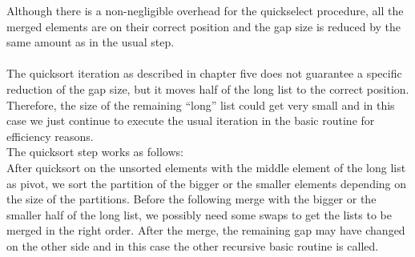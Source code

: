 \documentclass[11pt,pdftex,a4paper, twocolumn]{article}
\begin{document}
Although there is a non-negligible overhead for the quickselect procedure, all the merged elements are on their correct position and the gap size is reduced by the same amount as in the usual step. \\
$ $ \\
The quicksort iteration as described in chapter five does not guarantee a specific reduction of the gap size, but it moves half of the long list to the correct position. Therefore, the size of the remaining “long” list could get very small and in this case we just continue to execute the usual iteration in the basic routine for efficiency reasons. \\
The quicksort step works as follows: \\
After quicksort on the unsorted elements with the middle element of the long list as pivot, we sort the partition of the bigger or the smaller elements depending on the size of the partitions. Before the following merge with the bigger or the smaller half of the long list, we possibly need some swaps to get the lists to be merged in the right order. After the merge, the remaining gap may have changed on the other side and in this case the other recursive basic routine is called.
\end{document}
